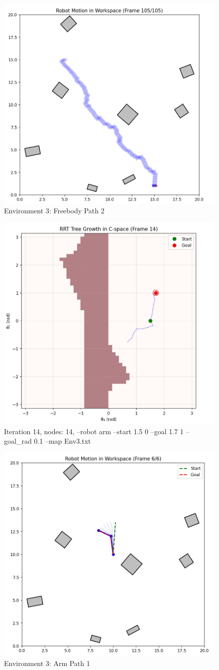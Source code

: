 \documentclass{article}
\begin{document}
\begin{figure} [H]
    \centering
    \includegraphics[width=0.5\linewidth]{latex_media/Env3RobotPathFB2.jpg}
    \caption{Environment 3: Freebody Path 2}
\end{figure}

\begin{figure} [H]
    \centering
    \includegraphics[width=0.5\linewidth]{latex_media/Env3TreeGrowthA1.jpg}
    \caption{Iteration 14, nodes: 14, --robot arm --start 1.5 0 --goal 1.7 1 --goal\_rad 0.1 --map Env3.txt}
\end{figure}

\begin{figure} [H]
    \centering
    \includegraphics[width=0.5\linewidth]{latex_media/Env3RobotPathA1.jpg}
    \caption{Environment 3: Arm Path 1}
\end{figure}
\end{document}
